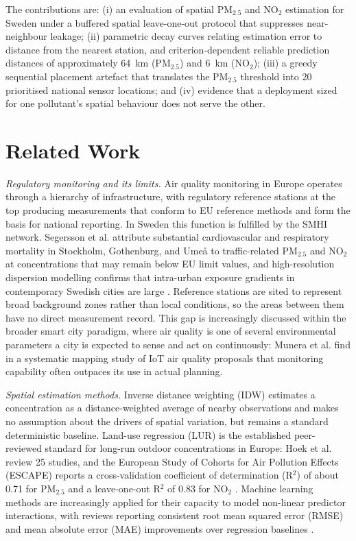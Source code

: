 \documentclass[conference]{IEEEtran}
\begin{document}
The contributions are: (i) an evaluation of spatial PM$_{2.5}$ and NO$_2$
estimation for Sweden under a buffered spatial leave-one-out protocol that
suppresses near-neighbour leakage; (ii) parametric decay curves relating
estimation error to distance from the nearest station, and criterion-dependent
reliable prediction distances of approximately 64~km (PM$_{2.5}$) and 6~km
(NO$_2$); (iii) a greedy sequential placement artefact that translates the
PM$_{2.5}$ threshold into 20 prioritised national sensor locations; and (iv)
evidence that a deployment sized for one pollutant's spatial behaviour does not
serve the other.

\section{Related Work}
\label{sec:related}

\textit{Regulatory monitoring and its limits.} Air quality monitoring in
Europe operates through a hierarchy of infrastructure, with regulatory
reference stations at the top producing measurements that conform to EU
reference methods and form the basis for national reporting. In Sweden this
function is fulfilled by the SMHI network. Segersson et al.
\cite{segersson_sweden_health_2017} attribute substantial cardiovascular and
respiratory mortality in Stockholm, Gothenburg, and Ume\r{a} to traffic-related
PM$_{2.5}$ and NO$_2$ at concentrations that may remain below EU limit values,
and high-resolution dispersion modelling confirms that intra-urban exposure
gradients in contemporary Swedish cities are large
\cite{sweden_dispersion_2024}. Reference stations are sited to represent broad
background zones rather than local conditions, so the areas between them have
no direct measurement record. This gap is increasingly discussed within the
broader smart city paradigm, where air quality is one of several
environmental parameters a city is expected to sense and act on
continuously: Munera et al. \cite{munera_iot_aq_smart_cities_2021} find in a
systematic mapping study of IoT air quality proposals that monitoring
capability often outpaces its use in actual planning.

\textit{Spatial estimation methods.} Inverse distance weighting (IDW)
estimates a concentration as a distance-weighted average of nearby
observations and makes no assumption about the drivers of spatial variation,
but remains a standard deterministic baseline. Land-use regression (LUR) is
the established peer-reviewed standard for long-run outdoor concentrations in
Europe: Hoek et al. \cite{hoek_lur_review_2008} review 25 studies, and the
European Study of Cohorts for Air Pollution Effects (ESCAPE) reports a
cross-validation coefficient of determination (R$^2$) of about 0.71 for
PM$_{2.5}$ \cite{eeftens_escape_pm_2012} and a leave-one-out R$^2$ of 0.83 for
NO$_2$ \cite{wang_escape_no2_2013}. Machine learning methods are increasingly
applied for their capacity to model non-linear predictor interactions, with
reviews reporting consistent root mean squared error (RMSE) and mean absolute
error (MAE) improvements over regression baselines
\cite{agbehadji_ml_aq_review_2024, chen_pm25_interpolation_2021}.
\end{document}
